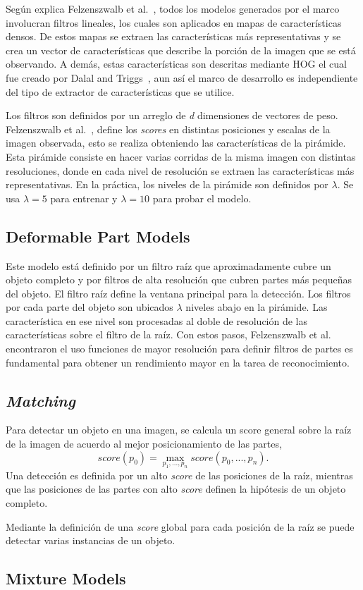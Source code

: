 Según explica Felzenszwalb et al.~\cite{Felzenszwalb2010}, todos los modelos generados por el marco involucran filtros lineales, los cuales son aplicados en mapas de características densos. De estos mapas se extraen las características más representativas y se crea un vector de características que describe la porción de la imagen que se está observando. A demás, estas características son descritas mediante HOG el cual fue creado por Dalal and Triggs~\cite{Dalal2005}, aun así el marco de desarrollo es independiente del tipo de extractor de características que se utilice.

Los filtros son definidos por un arreglo de \textit{d} dimensiones de vectores de peso. Felzenszwalb et al.~\cite{Felzenszwalb2010}, define los \textit{scores} en distintas posiciones y escalas de la imagen observada, esto se realiza obteniendo las características de la pirámide. Esta pirámide consiste en hacer varias corridas de la misma imagen con distintas resoluciones, donde en cada nivel de resolución se extraen las características más representativas. En la práctica, los niveles de la pirámide son definidos por $\lambda$. Se usa $\lambda = 5$ para entrenar y $\lambda = 10$ para probar el modelo.

\subsection{Deformable Part Models}\label{subsec:dpm}
Este modelo está definido por un filtro raíz que aproximadamente cubre un objeto completo y por filtros de alta resolución que cubren partes más pequeñas del objeto. El filtro raíz define la ventana principal para la detección. Los filtros por cada parte del objeto son ubicados $\lambda$ niveles abajo en la pirámide. Las característica en ese nivel son procesadas al doble de resolución de las características sobre el filtro de la raíz.
Con estos pasos, Felzenszwalb et al.~\cite{Felzenszwalb2010, Felzenszwalb2013} encontraron el uso funciones de mayor resolución para definir filtros de partes es fundamental para obtener un rendimiento mayor en la tarea de reconocimiento.

\subsection{\textit{Matching}}\label{subsec:matching}
Para detectar un objeto en una imagen, se calcula un score general sobre la raíz de la imagen de acuerdo al mejor posicionamiento de las partes, 
\begin{equation}
	\mathit{score}(p_{0}) = \max_{p_{1}, ..., p_{n}} \mathit{score}(p_{0}, ..., p_{n}).
\end{equation} 
Una detección es definida por un alto \textit{score} de las posiciones de la raíz, mientras que las posiciones de las partes con alto \textit{score} definen la hipótesis de un objeto completo.

Mediante la definición de una \textit{score} global para cada posición de la raíz se puede detectar varias instancias de un objeto.

\subsection{Mixture Models}\label{subsec:mm}